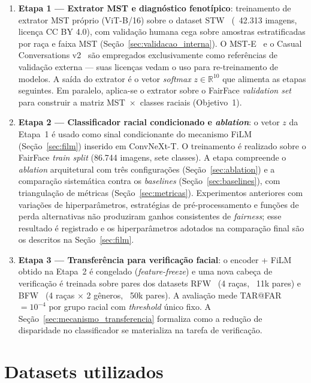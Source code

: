 \begin{enumerate}
\item \textbf{Etapa 1 --- Extrator MST e diagnóstico fenotípico}: treinamento de extrator MST próprio (ViT-B/16) sobre o dataset STW~\cite{matias2026large} (~42.313 imagens, licença CC BY 4.0), com validação humana cega sobre amostras estratificadas por raça e faixa MST (Seção~\ref{sec:validacao_interna}). O MST-E~\cite{schumann2023consensus} e o Casual Conversations v2~\cite{porgali2023casual} são empregados exclusivamente como referências de validação externa --- suas licenças vedam o uso para re-treinamento de modelos. A saída do extrator é o vetor \emph{softmax} $z \in \mathbb{R}^{10}$ que alimenta as etapas seguintes. Em paralelo, aplica-se o extrator sobre o FairFace \emph{validation set} para construir a matriz MST~$\times$~classes raciais (Objetivo~1).

\item \textbf{Etapa 2 --- Classificador racial condicionado e \emph{ablation}}: o vetor $z$ da Etapa~1 é usado como sinal condicionante do mecanismo FiLM (Seção~\ref{sec:film}) inserido em ConvNeXt-T. O treinamento é realizado sobre o FairFace \emph{train split} (86.744 imagens, sete classes). A etapa compreende o \emph{ablation} arquitetural com três configurações (Seção~\ref{sec:ablation}) e a comparação sistemática contra os \emph{baselines} (Seção~\ref{sec:baselines}), com triangulação de métricas (Seção~\ref{sec:metricas}). Experimentos anteriores com variações de hiperparâmetros, estratégias de pré-processamento e funções de perda alternativas não produziram ganhos consistentes de \emph{fairness}; esse resultado é registrado e os hiperparâmetros adotados na comparação final são os descritos na Seção~\ref{sec:film}.

\item \textbf{Etapa 3 --- Transferência para verificação facial}: o encoder + FiLM obtido na Etapa~2 é congelado (\emph{feature-freeze}) e uma nova cabeça de verificação é treinada sobre pares dos datasets RFW~\cite{wang2019racial} (4 raças, ~11k pares) e BFW~\cite{robinson2020face} (4 raças $\times$ 2 gêneros, ~50k pares). A avaliação mede TAR@FAR~$= 10^{-4}$ por grupo racial com \emph{threshold} único fixo. A Seção~\ref{sec:mecanismo_transferencia} formaliza como a redução de disparidade no classificador se materializa na tarefa de verificação.
\end{enumerate}

\section{Datasets utilizados}
\label{sec:datasets}

